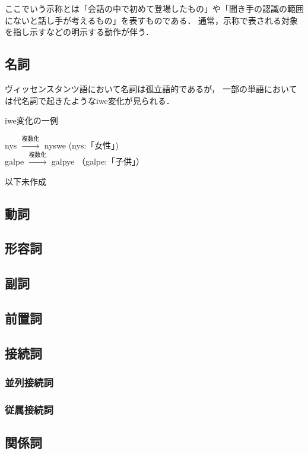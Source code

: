 \documentclass[uplatex,a4paper]{jsarticle}
\begin{document}
ここでいう示称とは「会話の中で初めて登場したもの」や「聞き手の認識の範囲にないと話し手が考えるもの」を表すものである．
通常，示称で表される対象を指し示すなどの明示する動作が伴う．

\subsection{名詞}
ヴィッセンスタンツ語において名詞は孤立語的であるが，
一部の単語においては代名詞で起きたようなiwe変化が見られる．
\begin{itembox}[l]{iwe変化の一例}
 \begin{center}
  nys $\xrightarrow{\text{複数化}}$ nyswe (nys:「女性」) \\
  galpe $\xrightarrow{\text{複数化}}$ galpye （galpe:「子供」）
 \end{center}
\end{itembox}

以下未作成

\subsection{動詞}
\subsection{形容詞}
\subsection{副詞}
\subsection{前置詞}
\subsection{接続詞}
\subsubsection{並列接続詞}
\subsubsection{従属接続詞}
\subsection{関係詞}
\end{document}
